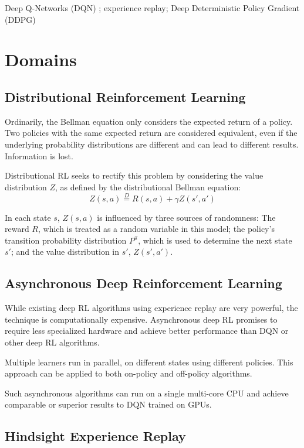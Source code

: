 \documentclass[runningheads]{llncs}
\begin{document}
Deep Q-Networks (DQN) \cite{mnih2013playing}; experience replay; Deep Deterministic Policy Gradient (DDPG) \cite{lillicrap2015continuous} %

\section{Domains}

\subsection{Distributional Reinforcement Learning}

Ordinarily, the Bellman equation only considers the expected return of a policy. Two policies with the same expected return are considered equivalent, even if the underlying probability distributions are different and can lead to different results. Information is lost.

Distributional RL \cite{bellemare2017distributional} seeks to rectify this problem by considering the value distribution $Z$, as defined by the distributional Bellman equation: $$Z(s,a) \overset{D}{=} R(s,a) + \gamma Z(s',a')$$

In each state $s$, $Z(s,a)$ is influenced by three sources of randomness: The reward $R$, which is treated as a random variable in this model; the policy's transition probability distribution $P^\pi$, which is used to determine the next state $s'$; and the value distribution in $s'$, $Z(s',a')$.

\subsection{Asynchronous Deep Reinforcement Learning}

While existing deep RL algorithms using experience replay are very powerful, the technique is computationally expensive. Asynchronous deep RL \cite{mnih2016asynchronous} promises to require less specialized hardware and achieve better performance than DQN or other deep RL algorithms.

Multiple learners run in parallel, on different states using different policies.
This approach can be applied to both on-policy and off-policy algorithms.

Such asynchronous algorithms can run on a single multi-core CPU and achieve comparable or superior results to DQN trained on GPUs.

\subsection{Hindsight Experience Replay}
\end{document}
